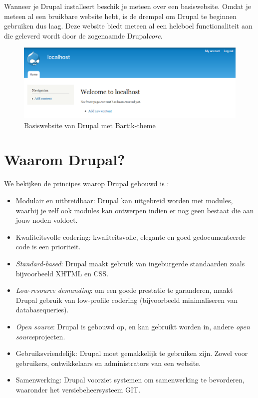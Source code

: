 Wanneer je Drupal installeert beschik je meteen over een basiswebsite. Omdat je meteen al een bruikbare website hebt, is de drempel om Drupal te beginnen gebruiken dus laag. Deze website biedt meteen al een heleboel functionaliteit aan die geleverd wordt door de zogenaamde Drupal\textit{core}. %
\begin{figure}[h]
\begin{center}
\includegraphics[keepaspectratio,width=1\textwidth]{fig/drupalBasiswebsite}
\vspace{-10pt}
\caption{Basiswebsite van Drupal met Bartik-theme}
\vspace{-30pt}
\end{center}
\end{figure}

\section{Waarom Drupal?}

We bekijken de principes waarop Drupal gebouwd is \cite{drupalMission}:
\begin{itemize}
\item Modulair en uitbreidbaar: Drupal kan uitgebreid worden met modules, waarbij je zelf ook modules kan ontwerpen indien er nog geen bestaat die aan jouw noden voldoet.
\item Kwaliteitsvolle codering: kwaliteitsvolle, elegante en goed gedocumenteerde code is een prioriteit.
\item \textit{Standard-based}: Drupal maakt gebruik van ingeburgerde standaarden zoals bijvoorbeeld XHTML en CSS.
\item \textit{Low-resource demanding}: om een goede prestatie te garanderen, maakt Drupal gebruik van low-profile codering (bijvoorbeeld minimaliseren van databasequeries).
\item \textit{Open source}: Drupal is gebouwd op, en kan gebruikt worden in, andere \textit{open source}projecten.
\item Gebruiksvriendelijk: Drupal moet gemakkelijk te gebruiken zijn. Zowel voor gebruikers, ontwikkelaars en administrators van een website.
\item Samenwerking: Drupal voorziet systemen om samenwerking te bevorderen, waaronder het versiebeheersysteem GIT.
\end{itemize}

